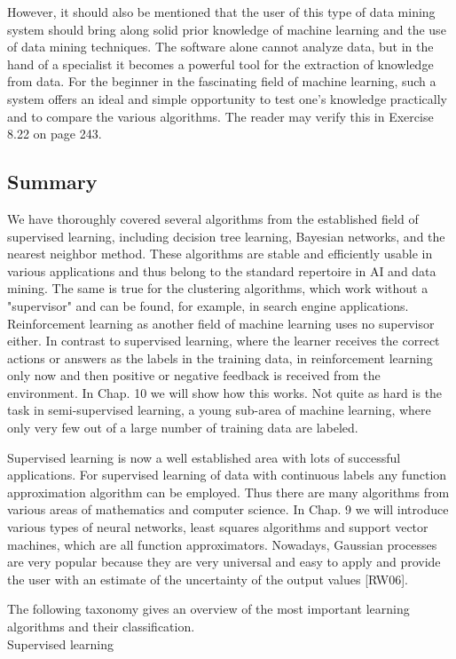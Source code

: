 \documentclass[10pt]{article}
\begin{document}
However, it should also be mentioned that the user of this type of data mining system should bring along solid prior knowledge of machine learning and the use of data mining techniques. The software alone cannot analyze data, but in the hand of a specialist it becomes a powerful tool for the extraction of knowledge from data. For the beginner in the fascinating field of machine learning, such a system offers an ideal and simple opportunity to test one's knowledge practically and to compare the various algorithms. The reader may verify this in Exercise 8.22 on page 243.

\subsection*{Summary}
We have thoroughly covered several algorithms from the established field of supervised learning, including decision tree learning, Bayesian networks, and the nearest neighbor method. These algorithms are stable and efficiently usable in various applications and thus belong to the standard repertoire in AI and data mining. The same is true for the clustering algorithms, which work without a "supervisor" and can be found, for example, in search engine applications. Reinforcement learning as another field of machine learning uses no supervisor either. In contrast to supervised learning, where the learner receives the correct actions or answers as the labels in the training data, in reinforcement learning only now and then positive or negative feedback is received from the environment. In Chap. 10 we will show how this works. Not quite as hard is the task in semi-supervised learning, a young sub-area of machine learning, where only very few out of a large number of training data are labeled.

Supervised learning is now a well established area with lots of successful applications. For supervised learning of data with continuous labels any function approximation algorithm can be employed. Thus there are many algorithms from various areas of mathematics and computer science. In Chap. 9 we will introduce various types of neural networks, least squares algorithms and support vector machines, which are all function approximators. Nowadays, Gaussian processes are very popular because they are very universal and easy to apply and provide the user with an estimate of the uncertainty of the output values [RW06].

The following taxonomy gives an overview of the most important learning algorithms and their classification.\\
Supervised learning
\end{document}
